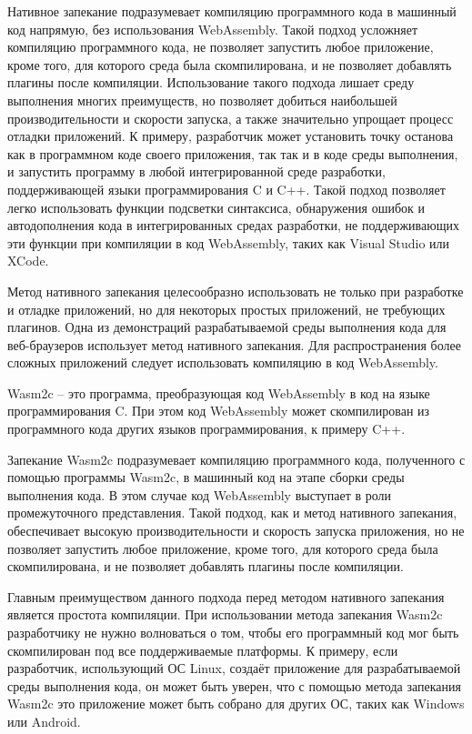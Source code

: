 Нативное запекание подразумевает компиляцию программного кода в машинный код напрямую, без использования WebAssembly.
Такой подход усложняет компиляцию программного кода, не позволяет запустить любое приложение, кроме того, для которого среда была скомпилирована, и не позволяет добавлять плагины после компиляции.
Использование такого подхода лишает среду выполнения многих преимуществ, но позволяет добиться наибольшей производительности и скорости запуска, а также значительно упрощает процесс отладки приложений.
К примеру, разработчик может установить точку останова как в программном коде своего приложения, так так и в коде среды выполнения, и запустить программу в любой интегрированной среде разработки, поддерживающей языки программирования C и C++.
Такой подход позволяет легко использовать функции подсветки синтаксиса, обнаружения ошибок и автодополнения кода в интегрированных средах разработки, не поддерживающих эти функции при компиляции в код WebAssembly, таких как Visual Studio или XCode.

Метод нативного запекания целесообразно использовать не только при разработке и отладке приложений, но для некоторых простых приложений, не требующих плагинов.
Одна из демонстраций разрабатываемой среды выполнения кода для веб-браузеров использует метод нативного запекания.
Для распространения более сложных приложений следует использовать компиляцию в код WebAssembly.

Wasm2c -- это программа, преобразующая код WebAssembly в код на языке программирования C.
При этом код WebAssembly может скомпилирован из программного кода других языков программирования, к примеру C++.

Запекание Wasm2c подразумевает компиляцию программного кода, полученного с помощью программы Wasm2c, в машинный код на этапе сборки среды выполнения кода.
В этом случае код WebAssembly выступает в роли промежуточного представления.
Такой подход, как и метод нативного запекания, обеспечивает высокую производительности и скорость запуска приложения, но не позволяет запустить любое приложение, кроме того, для которого среда была скомпилирована, и не позволяет добавлять плагины после компиляции.

Главным преимуществом данного подхода перед методом нативного запекания является простота компиляции.
При использовании метода запекания Wasm2c разработчику не нужно волноваться о том, чтобы его программный код мог быть скомпилирован под все поддерживаемые платформы.
К примеру, если разработчик, использующий ОС Linux, создаёт приложение для разрабатываемой среды выполнения кода, он может быть уверен, что с помощью метода запекания Wasm2c это приложение может быть собрано для других ОС, таких как Windows или Android.
